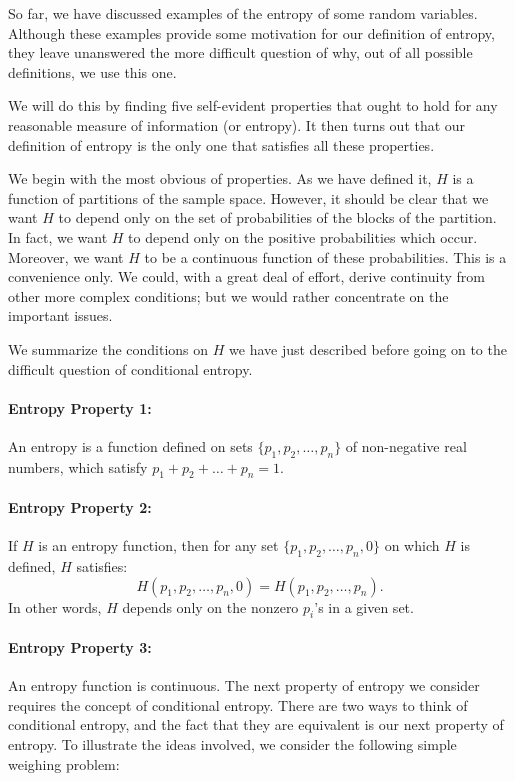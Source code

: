 \documentclass{report}
\begin{document}
So far, we have discussed examples of the entropy of some random variables. Although these examples provide some motivation for our definition of entropy, they leave unanswered the more difficult question of why, out of all possible definitions, we use this one.

We will do this by finding five self-evident properties that ought to hold for any reasonable measure of information (or entropy). It then turns out that our definition of entropy is the only one that satisfies all these properties.

We begin with the most obvious of properties. As we have defined it, \( H \) is a function of partitions of the sample space. However, it should be clear that we want \( H \) to depend only on the set of probabilities of the blocks of the partition. In fact, we want \( H \) to depend only on the positive probabilities which occur. Moreover, we want \( H \) to be a continuous function of these probabilities. This is a convenience only. We could, with a great deal of effort, derive continuity from other more complex conditions; but we would rather concentrate on the important issues. 

We summarize the conditions on \( H \) we have just described before going on to the difficult question of conditional entropy.

\paragraph{Entropy Property 1:} 
An entropy is a function defined on sets \( \{p_1, p_2, \ldots, p_n\} \) of non-negative real numbers, which satisfy \( p_1 + p_2 + \ldots + p_n = 1 \).

\paragraph{Entropy Property 2:} 
If \( H \) is an entropy function, then for any set \( \{p_1, p_2, \ldots, p_n, 0\} \) on which \( H \) is defined, \( H \) satisfies:
\[
H(p_1, p_2, \ldots, p_n, 0) = H(p_1, p_2, \ldots, p_n).
\]
In other words, \( H \) depends only on the nonzero \( p_i \)'s in a given set.

\paragraph{Entropy Property 3:} 
An entropy function is continuous.
The next property of entropy we consider requires the concept of conditional entropy. There are two ways to think of conditional entropy, and the fact that they are equivalent is our next property of entropy. To illustrate the ideas involved, we consider the following simple weighing problem:
\end{document}
